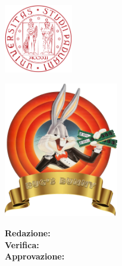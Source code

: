 \begin{titlepage}
    \begin{center}
        \makeatletter
        \vspace*{\fill}
        
        
        \begin{minipage}[]{0.3\textwidth}
            \centering
            \includegraphics[width=3cm]{assets/unipd}
            \bigskip
        \end{minipage}
        \begin{minipage}[]{0.7\textwidth}
            \centering
                \vspace*{2cm}
        \end{minipage}
        

        \includegraphics[width=5cm]{assets/logo}

        \Huge
        \textbf{\teamname}
        
        \vspace{3cm}
        
        \Huge
        \textbf{\@title}

        \Large
        \@date

        \vspace{3cm}
        
        \textbf{Redazione:} \@author\\
        \textbf{Verifica:}\\
        \textbf{Approvazione:}\\
        
        \vfill
        \makeatother
    \end{center}
\end{titlepage}
